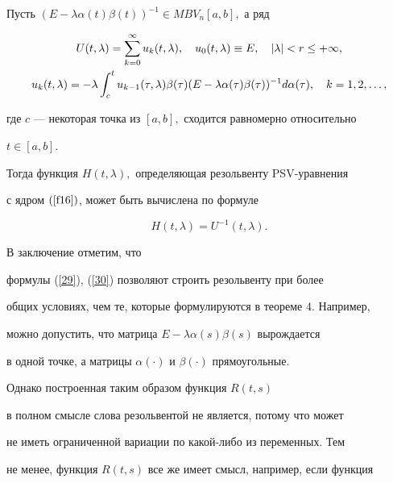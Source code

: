 \begin{thm}


Пусть $(E-\lambda\alpha(t)\beta(t))^{-1}\in MBV_n[a,b],$ а ряд


\begin{gather}\label{29}


U(t,\lambda)=\sum_{k=0}^\infty u_k(t,\lambda),


\quad u_0(t,\lambda)\equiv E,\quad|\lambda|<r\leq+\infty,\\


%


\label{30}


u_k(t,\lambda)=-\lambda\integral{c}{t}u_{k-1}(\tau,\lambda)


\beta(\tau)(E-\lambda\alpha(\tau)\beta(\tau))^{-1}d\alpha(\tau),


\quad k=1,2,\dotsc,


\end{gather}


где $c$ --- некоторая точка из $[a,b],$ сходится равномерно относительно


$t\in[a,b].$


Тогда функция $H(t,\lambda),$ определяющая резольвенту PSV-уравнения


с ядром $(\ref{f16})$, может быть вычислена по формуле


$$


H(t,\lambda)=U^{-1}(t,\lambda).


$$


\end{thm}





В заключение отметим, что


формулы (\ref{29}), (\ref{30}) позволяют строить резольвенту при более


общих условиях, чем те, которые формулируются в теореме 4. Например,


можно допустить, что матрица $E-\lambda\alpha(s)\beta(s)$ вырождается


в одной точке, а матрицы $\alpha(\cdot)$ и $\beta(\cdot)$ прямоугольные.


Однако построенная таким образом функция $R(t,s)$


в полном смысле слова резольвентой не является, потому что может


не иметь ограниченной вариации по какой-либо из переменных. Тем


не менее, функция $R(t,s)$ все же имеет смысл, например, если функция


